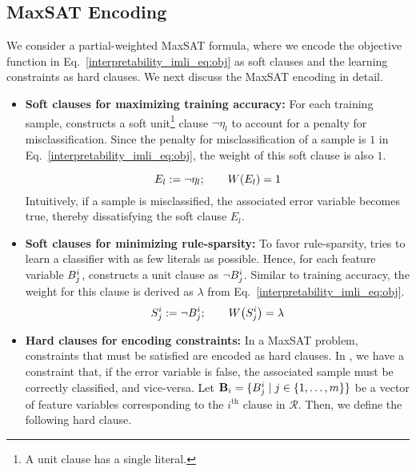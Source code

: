 \subsection{MaxSAT Encoding}
\label{interpretability_imli_sec:encoding}
We consider a partial-weighted MaxSAT formula, where we encode the objective function in Eq.~\eqref{interpretability_imli_eq:obj} as soft clauses and the learning constraints as hard clauses. We next discuss the MaxSAT encoding in detail.

\begin{itemize}
	\item \textbf{Soft clauses for maximizing training accuracy:} For each training sample, {\imli} constructs a soft unit\footnote{A unit clause has a single literal.} clause $ \neg \eta_l $ to account for a penalty for misclassification. Since the penalty for misclassification of a sample is $ 1 $  in Eq.~\eqref{interpretability_imli_eq:obj},  the weight of this soft clause is also $ 1 $. 
	
	\begin{equation}
		\label{interpretability_imli_soft_clause_error}
		E_l:=\neg \eta_l;  \qquad W \! \left( E_l \right)= 1
	\end{equation}
	Intuitively, if a sample is misclassified, the associated error variable becomes true, thereby dissatisfying the soft clause $ E_l $.
	 
	
	\item \textbf{Soft clauses for minimizing rule-sparsity:} To favor rule-sparsity, {\imli} tries to learn a classifier with as few literals as possible. Hence, for each feature variable $ B_j^i $, {\imli} constructs a unit clause as $ \neg B_j^i $. Similar to training accuracy, the weight for this clause is derived as $ \lambda $ from Eq.~\eqref{interpretability_imli_eq:obj}.
	\begin{equation}
		\label{interpretability_imli_soft_clause_feature}
		S_j^i:= \neg B_j^i; \qquad W \! \left( S_j^i \right)= \lambda
	\end{equation}
	

	
	\item \textbf{Hard clauses for encoding constraints:} In a MaxSAT problem, constraints that must be satisfied are encoded as hard clauses. In {\imli}, we have a constraint that, if the error variable is false, the associated sample must be correctly classified, and vice-versa. Let  $\mathbf{B}_i= \{B^i_{j} \mid j \in \{1,\dots,m \}\}$ be a vector of feature variables corresponding to the $ i^\text{th} $  clause in $ \mathcal{R} $. Then, we define the following hard clause.
	

\end{itemize}
